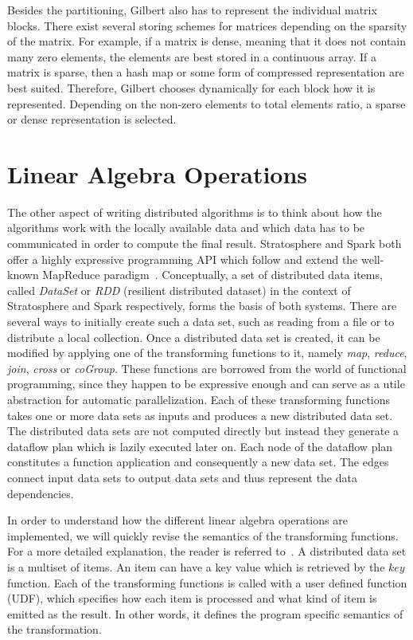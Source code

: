 Besides the partitioning, Gilbert also has to represent the individual matrix blocks.
There exist several storing schemes for matrices depending on the sparsity of the matrix.
For example, if a matrix is dense, meaning that it does not contain many zero elements, the elements are best stored in a continuous array.
If a matrix is sparse, then a hash map or some form of compressed representation are best suited.
Therefore, Gilbert chooses dynamically for each block how it is represented.
Depending on the non-zero elements to total elements ratio, a sparse or dense representation is selected.

\section{Linear Algebra Operations}
\label{sec:LinearAlgebraOperations}

The other aspect of writing distributed algorithms is to think about how the algorithms work with the locally available data and which data has to be communicated in order to compute the final result.
Stratosphere and Spark both offer a highly expressive programming API which follow and extend the well-known MapReduce paradigm~\cite{dean:c2008a}.
Conceptually, a set of distributed data items, called \emph{DataSet} or \emph{RDD} (resilient distributed dataset) in the context of Stratosphere and Spark respectively, forms the basis of both systems.
There are several ways to initially create such a data set, such as reading from a file or to distribute a local collection.
Once a distributed data set is created, it can be modified by applying one of the transforming functions to it, namely \emph{map}, \emph{reduce}, \emph{join}, \emph{cross} or \emph{coGroup}.
These functions are borrowed from the world of functional programming, since they happen to be expressive enough and can serve as a utile abstraction for automatic parallelization.
Each of these transforming functions takes one or more data sets as inputs and produces a new distributed data set.
The distributed data sets are not computed directly but instead they generate a dataflow plan which is lazily executed later on.
Each node of the dataflow plan constitutes a function application and consequently a new data set.
The edges connect input data sets to output data sets and thus represent the data dependencies.

In order to understand how the different linear algebra operations are implemented, we will quickly revise the semantics of the transforming functions.
For a more detailed explanation, the reader is referred to~\cite{zaharia:2012a,alexandrov:2011a,battre:2010a}.
A distributed data set is a multiset of items.
An item can have a key value which is retrieved by the $key$ function.
Each of the transforming functions is called with a user defined function (UDF), which specifies how each item is processed and what kind of item is emitted as the result.
In other words, it defines the program specific semantics of the transformation.


